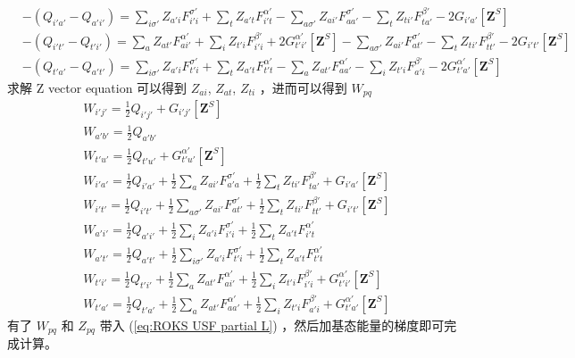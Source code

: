 \documentclass[11pt]{ctexart}
\numberwithin{equation}{section}
\begin{document}
\begin{equation}
    \begin{aligned}
        & -(Q_{i'a'}-Q_{a'i'}) 
        = \sum_{i\sigma'}Z_{a'i}F_{i'i}^{\sigma'}
        + \sum_{t}Z_{a't}F_{i't}^{\alpha'}
        - \sum_{a\sigma'}Z_{ai'}F_{aa'}^{\sigma'} 
        - \sum_{t}Z_{ti'}F_{ta'}^{\beta'}
        - 2G_{i'a'}[\mathbf{Z}^{S}] \\
        & -(Q_{i't'}-Q_{t'i'}) 
        = \sum_{a}Z_{at'}F_{ai'}^{\alpha'}
        + \sum_{i}Z_{t' i}F_{i' i}^{\beta'}
        + 2G_{t'i'}^{\alpha'}[\mathbf{Z}^{S}]
        - \sum_{a\sigma'}Z_{ai'}F_{at'}^{\sigma'}
        - \sum_{t}Z_{ti'}F_{tt'}^{\beta'}
        - 2G_{i't'}[\mathbf{Z}^{S}]\\
        & -(Q_{t'a'}-Q_{a't'})
        = \sum_{i\sigma'}Z_{a'i}F_{t'i}^{\sigma'}
        + \sum_{t}Z_{a't}F_{t't}^{\alpha'}
        - \sum_{a}Z_{at'}F_{aa'}^{\alpha'}
        - \sum_{i}Z_{t' i}F_{a' i}^{\beta'}
        - 2G_{t'a'}^{\alpha'}[\mathbf{Z}^{S}]
    \end{aligned}
\end{equation}
求解 Z vector equation 可以得到 $Z_{ai}$, $Z_{at}$, $Z_{ti}$ ，进而可以得到 $W_{pq}$
\begin{equation}
    \begin{aligned}
        & W_{i'j'} = \frac{1}{2}Q_{i'j'} + G_{i'j'}[\mathbf{Z}^{S}]\\
        & W_{a'b'} = \frac{1}{2}Q_{a'b'}\\
        & W_{t'u'} = \frac{1}{2}Q_{t'u'} + G_{t'u'}^{\alpha'}[\mathbf{Z}^{S}]\\
        & W_{i'a'} = \frac{1}{2}Q_{i'a'} + \frac{1}{2}\sum_{a}Z_{ai'}F_{a'a}^{\sigma'} + \frac{1}{2}\sum_{t}Z_{ti'}F_{ta'}^{\beta'} + G_{i'a'}[\mathbf{Z}^{S}]\\
        & W_{i't'} = \frac{1}{2}Q_{i't'} + \frac{1}{2}\sum_{a\sigma'}Z_{ai'}F_{at'}^{\sigma'} + \frac{1}{2}\sum_{t}Z_{ti'}F_{tt'}^{\beta'} + G_{i't'}[\mathbf{Z}^{S}]\\
        & W_{a'i'} = \frac{1}{2}Q_{a'i'} + \frac{1}{2}\sum_{i}Z_{a'i}F_{i'i}^{\sigma'} + \frac{1}{2}\sum_{t}Z_{a't}F_{i't}^{\alpha'}\\
        & W_{a't'} = \frac{1}{2}Q_{a't'} + \frac{1}{2}\sum_{i\sigma'}Z_{a'i}F_{t'i}^{\sigma'} + \frac{1}{2}\sum_{t}Z_{a't}F_{t't}^{\alpha'}\\
        & W_{t'i'} = \frac{1}{2}Q_{t'i'} + \frac{1}{2}\sum_{a}Z_{at'}F_{ai'}^{\alpha'} + \frac{1}{2}\sum_{i}Z_{t' i}F_{i' i}^{\beta'} + G_{t'i'}^{\alpha'}[\mathbf{Z}^{S}]\\
        & W_{t'a'} = \frac{1}{2}Q_{t'a'} + \frac{1}{2}\sum_{a}Z_{at'}F_{aa'}^{\alpha'} + \frac{1}{2}\sum_{i}Z_{t' i}F_{a' i}^{\beta'} + G_{t'a'}^{\alpha'}[\mathbf{Z}^{S}]
    \end{aligned}
\end{equation}
有了 $W_{pq}$ 和 $Z_{pq}$ 带入 (\ref{eq:ROKS USF partial L}) ，然后加基态能量的梯度即可完成计算。
\end{document}
